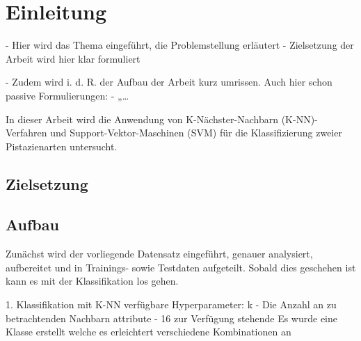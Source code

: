 
\section{Einleitung}

- Hier wird das Thema eingeführt, die Problemstellung erläutert 
- Zielsetzung der Arbeit wird hier klar formuliert

- Zudem wird i. d. R. der Aufbau der Arbeit kurz umrissen.
Auch hier schon passive Formulierungen:
- „…


In dieser Arbeit wird die Anwendung von K-Nächster-Nachbarn (K-NN)-Verfahren und Support-Vektor-Maschinen (SVM) für die Klassifizierung zweier Pistazienarten untersucht. 

\subsection{Zielsetzung}

\subsection{Aufbau}
Zunächst wird der vorliegende Datensatz eingeführt, genauer analysiert, aufbereitet und in Trainings- sowie Testdaten aufgeteilt.
Sobald dies geschehen ist kann es mit der Klassifikation los gehen.

1. Klassifikation mit K-NN
verfügbare Hyperparameter:
 k - Die Anzahl an zu betrachtenden Nachbarn
 attribute - 16 zur Verfügung stehende
Es wurde eine Klasse erstellt welche es erleichtert verschiedene Kombinationen an 
